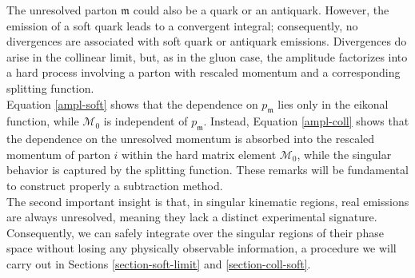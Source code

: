 \documentclass[a4paper, 12pt]{book}
\newcommand{\um}{\mathfrak{m}}
\begin{document}
The unresolved parton $\um$ could also be a quark or an antiquark. However, the emission of a soft quark leads to a convergent integral; consequently, no divergences are associated with soft quark or antiquark emissions. Divergences do arise in the collinear limit, but, as in the gluon case, the amplitude factorizes into a hard process involving a parton with rescaled momentum and a corresponding splitting function. \\
Equation \ref{ampl-soft} shows that the dependence on $p_\um$ lies only in the eikonal function, while $\mathcal{M}_0$ is independent of $p_\um$. Instead, Equation \ref{ampl-coll} shows that the dependence on the unresolved momentum is absorbed into the rescaled momentum of parton $i$ within the hard matrix element $\mathcal{M}_0$, while the singular behavior is captured by the splitting function. These remarks will be fundamental to construct properly a subtraction method. \\
The second important insight is that, in singular kinematic regions, real emissions are always unresolved, meaning they lack a distinct experimental signature. Consequently, we can safely integrate over the singular regions of their phase space without losing any physically observable information, a procedure we will carry out in Sections \ref{section-soft-limit} and \ref{section-coll-soft}. 
\end{document}
